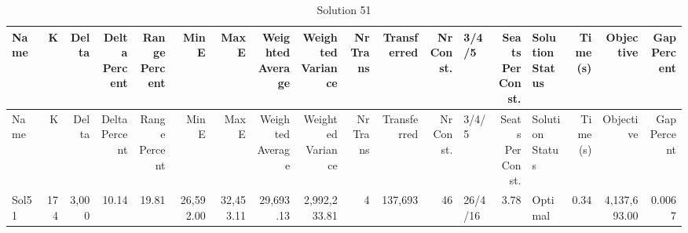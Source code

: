 \documentclass[a4paper]{article}
\begin{document}
{\scriptsize
\begin{longtable}{lrrrrrrrrrrrlrlrrr}
\caption{Solution 51}
\\ \toprule
Name &K &Delta &\shortstack{Delta\\Percent} &\shortstack{Range\\Percent} &Min E &Max E &\shortstack{Weighted\\Average} &\shortstack{Weighted\\Variance} &\shortstack{Nr\\Trans} &Transferred &\shortstack{Nr\\Const.} &3/4/5 &\shortstack{Seats\\Per\\Const.} &\shortstack{Solution\\Status} &\shortstack{Time\\(s)} &Objective &\shortstack{Gap\\Percent} \\ \midrule
\endfirsthead
\toprule
Name &K &Delta &\shortstack{Delta\\Percent} &\shortstack{Range\\Percent} &Min E &Max E &\shortstack{Weighted\\Average} &\shortstack{Weighted\\Variance} &\shortstack{Nr\\Trans} &Transferred &\shortstack{Nr\\Const.} &3/4/5 &\shortstack{Seats\\Per\\Const.} &\shortstack{Solution\\Status} &\shortstack{Time\\(s)} &Objective &\shortstack{Gap\\Percent} \\ \midrule
\endhead
\bottomrule
\endfoot
Sol51&174&3,000&10.14&19.81&26,592.00&32,453.11&29,693.13&2,992,233.81&4&137,693&46&26/4/16& 3.78&Optimal& 0.34&4,137,693.00&0.0067\\ 
\end{longtable}

}
\end{document}
